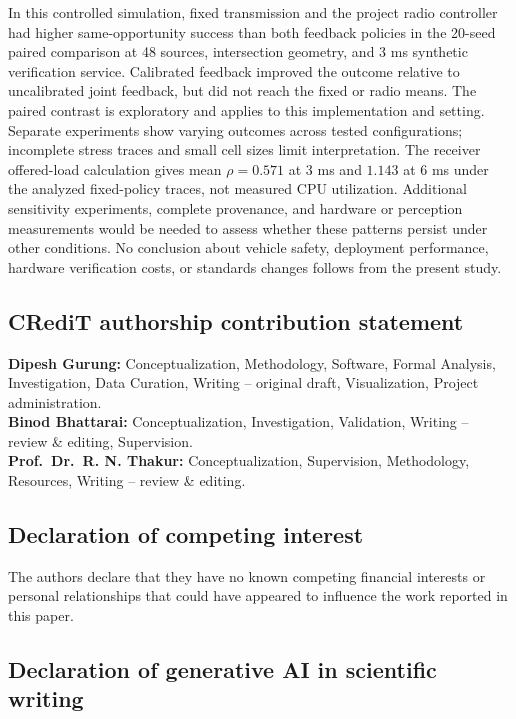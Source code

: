 \documentclass[
]{article}
\begin{document}
In this controlled simulation, fixed transmission and the project radio
controller had higher same-opportunity success than both feedback
policies in the 20-seed paired comparison at 48 sources, intersection
geometry, and 3 ms synthetic verification service. Calibrated feedback
improved the outcome relative to uncalibrated joint feedback, but did
not reach the fixed or radio means. The paired contrast is exploratory
and applies to this implementation and setting. Separate experiments
show varying outcomes across tested configurations; incomplete stress
traces and small cell sizes limit interpretation. The receiver
offered-load calculation gives mean \(\rho=0.571\) at 3 ms and \(1.143\)
at 6 ms under the analyzed fixed-policy traces, not measured CPU
utilization. Additional sensitivity experiments, complete provenance,
and hardware or perception measurements would be needed to assess
whether these patterns persist under other conditions. No conclusion
about vehicle safety, deployment performance, hardware verification
costs, or standards changes follows from the present study.

\subsection{CRediT authorship contribution
statement}\label{credit-authorship-contribution-statement}

\textbf{Dipesh Gurung:} Conceptualization, Methodology, Software, Formal
Analysis, Investigation, Data Curation, Writing -- original draft,
Visualization, Project administration.\\
\textbf{Binod Bhattarai:} Conceptualization, Investigation, Validation,
Writing -- review \& editing, Supervision.\\
\textbf{Prof.~Dr.~R. N. Thakur:} Conceptualization, Supervision,
Methodology, Resources, Writing -- review \& editing.

\subsection{Declaration of competing
interest}\label{declaration-of-competing-interest}

The authors declare that they have no known competing financial
interests or personal relationships that could have appeared to
influence the work reported in this paper.

\subsection{Declaration of generative AI in scientific
writing}\label{declaration-of-generative-ai-in-scientific-writing}
\end{document}
